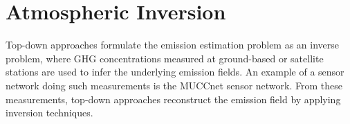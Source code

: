 



\section{Atmospheric Inversion}
Top-down approaches formulate the emission estimation problem as an inverse problem, where GHG concentrations measured at ground-based or satellite stations are used to infer the underlying emission fields.
An example of a sensor network doing such measurements is the MUCCnet sensor network.
From these measurements, top-down approaches reconstruct the emission field by applying inversion techniques. 

